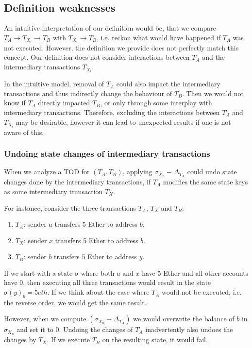 \documentclass[draft,final]{vutinfth} %
\begin{document}
\subsection{Definition weaknesses}
\label{sec:weaknesses}

An intuitive interpretation of our definition would be, that we compare $T_A \rightarrow T_{X_i} \rightarrow T_B$ with $T_{X_i} \rightarrow T_B$, i.e. reckon what would have happened if $T_A$ was not executed. However, the definition we provide does not perfectly match this concept. Our definition does not consider interactions between $T_A$ and the intermediary transactions $T_{X_i}$.

In the intuitive model, removal of $T_A$ could also impact the intermediary transactions and thus indirectly change the behaviour of $T_B$. Then we would not know if $T_A$ directly impacted $T_B$, or only through some interplay with intermediary transactions. Therefore, excluding the interactions between $T_A$ and $T_{X_i}$ may be desirable, however it can lead to unexpected results if one is not aware of this.

\subsubsection{Undoing state changes of intermediary transactions}

When we analyze a TOD for $(T_A, T_B)$, applying $\sigma_{X_n} - \Delta_{T_A}$ could undo state changes done by the intermediary transactions, if $T_A$ modifies the same state keys as some intermediary transaction $T_X$.

For instance, consider the three transactions $T_A$, $T_X$ and $T_B$:

\begin{enumerate}
    \item $T_A$: sender $a$ transfers 5 Ether to address $b$.
    \item $T_X$: sender $x$ transfers 5 Ether to address $b$.
    \item $T_B$: sender $b$ transfers 5 Ether to address $y$.
\end{enumerate}

If we start with a state $\sigma$ where both $a$ and $x$ have 5 Ether and all other accounts have 0, then executing all three transactions would result in the state $\sigma(y)_b = 5 eth$. If we think about the case where $T_A$ would not be executed, i.e. the reverse order, we would get the same result.

However, when we compute $(\sigma_{X_n} - \Delta_{T_A})$ we would overwrite the balance of $b$ in $\sigma_{X_n}$ and set it to 0. Undoing the changes of $T_A$ inadvertently also undoes the changes by $T_X$. If we execute $T_B$ on the resulting state, it would fail.
\end{document}
